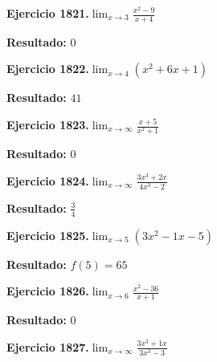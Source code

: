 \documentclass[10pt,a4paper]{article}
\begin{document}
\begin{ejbox}
\textbf{Ejercicio 1821.}\quad $\lim_{x\to 3} \frac{x^2-9}{x+4}$
\end{ejbox}

\begin{solbox}
\textbf{Resultado:} \(\displaystyle 0\)
\end{solbox}

\newpage
\begin{ejbox}
\textbf{Ejercicio 1822.}\quad $\lim_{x\to 4} (x^2 +6x +1)$
\end{ejbox}

\begin{solbox}
\textbf{Resultado:} \(\displaystyle 41\)
\end{solbox}

\begin{ejbox}
\textbf{Ejercicio 1823.}\quad $\lim_{x\to \infty} \frac{x + 5}{x^2 + 1}$
\end{ejbox}

\begin{solbox}
\textbf{Resultado:} \(\displaystyle 0\)
\end{solbox}

\begin{ejbox}
\textbf{Ejercicio 1824.}\quad $\lim_{x\to \infty} \frac{3x^3 + 2x}{4x^3 - 2}$
\end{ejbox}

\begin{solbox}
\textbf{Resultado:} \(\displaystyle \frac{3}{4}\)
\end{solbox}

\newpage
\begin{ejbox}
\textbf{Ejercicio 1825.}\quad $\lim_{x\to 5} (3x^2 -1x -5)$
\end{ejbox}

\begin{solbox}
\textbf{Resultado:} \(\displaystyle f(5) = 65\)
\end{solbox}

\begin{ejbox}
\textbf{Ejercicio 1826.}\quad $\lim_{x\to 6} \frac{x^2-36}{x+1}$
\end{ejbox}

\begin{solbox}
\textbf{Resultado:} \(\displaystyle 0\)
\end{solbox}

\begin{ejbox}
\textbf{Ejercicio 1827.}\quad $\lim_{x\to \infty} \frac{3x^3 + 1x}{3x^3 - 3}$
\end{ejbox}
\end{document}
